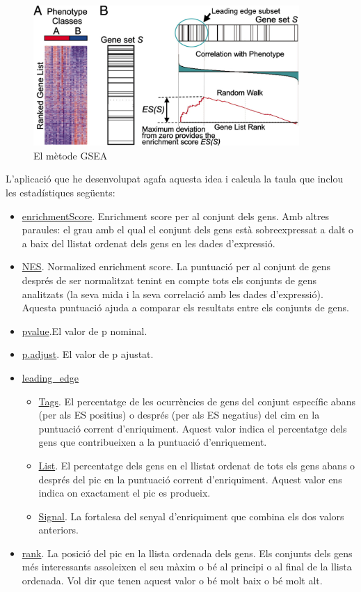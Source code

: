 \begin{figure}[H]
\centering
\includegraphics[width=0.9\textwidth]{GSEA_Method.jpg} 
\caption{El mètode GSEA}
\end{figure}

L'aplicació que he desenvolupat agafa aquesta idea i calcula la taula que inclou les estadístiques següents:

\begin{itemize}
\item \underline{enrichmentScore}. Enrichment score per al conjunt dels gens. Amb altres paraules: el grau amb el qual el conjunt dels gens està sobreexpressat a dalt o a baix del llistat ordenat dels gens en les dades d'expressió.
\item \underline{NES}. Normalized enrichment score. La puntuació per al conjunt de gens després de ser normalitzat tenint en compte tots els conjunts de gens analitzats (la seva mida i la seva correlació amb les dades d'expressió). Aquesta puntuació ajuda a comparar els resultats entre els conjunts de gens.
\item \underline{pvalue}.El valor de p nominal.
\item \underline{p.adjust}. El valor de p ajustat.
\item \underline{leading\_edge}
\begin{itemize}
\item \underline{Tags}. El percentatge de les ocurrències de gens del conjunt específic abans (per als ES positius) o després (per als ES negatius) del cim en la puntuació corrent d'enriquiment. Aquest valor indica el percentatge dels gens que contribueixen a la puntuació d'enriquement. 
\item \underline{List}. El percentatge dels gens en el llistat ordenat de tots els gens abans o després del pic en la puntuació corrent d'enriquiment. Aquest valor ens indica on exactament el pic es produeix. 
\item \underline{Signal}. La fortalesa del senyal d'enriquiment que combina els dos valors anteriors.
\end{itemize}
\item \underline{rank}. La posició del pic en la llista ordenada dels gens. Els conjunts dels gens més interessants assoleixen el seu màxim o bé al principi o al final de la llista ordenada. Vol dir que tenen aquest valor o bé molt baix o bé molt alt.
\end{itemize}


